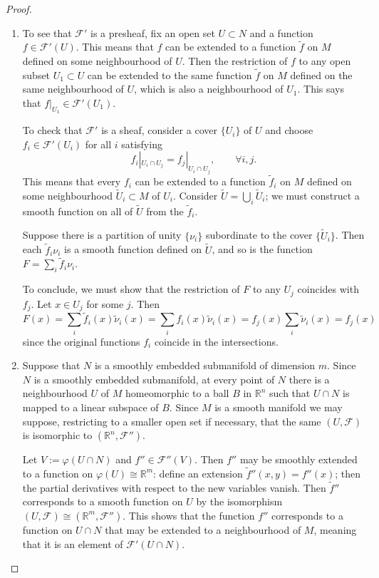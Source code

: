 \begin{proof}
\begin{enumerate}
\item To see that $\mathcal{F}'$ is a
presheaf, fix an open set $U \subset N$ and
a function $f \in \mathcal{F}'(U)$. This
means that $f$ can be extended to a
function $\tilde{f}$ on $M$ defined on some
neighbourhood of $U$. Then the restriction
of $f$ to any open subset $U_1 \subset U$
can be extended to the same function
$\tilde{f}$ on $M$ defined on the same
neighbourhood of $U$, which is also a
neighbourhood of $U_1$. This says that
$f|_{U_1}\in \mathcal{F}'(U_1)$.

To check that $\mathcal{F}'$ is a sheaf,
consider a cover $\{U_i\}$ of $U$ and choose
$f_i \in \mathcal{F}'(U_i)$ for all $i$
satisfying
$$
f_i|_{U_i \cap U_j}=f_j|_{U_i \cap U_j},
\qquad \forall i,j.
$$
This means that every $f_i$ can be extended
to a function $\tilde{f}_i$ on $M$ defined
on some neighbourhood $\tilde{U}_i \subset
M$ of $U_i$. Consider
$\tilde{U}=\bigcup_i \tilde{U}_i$; we must
construct a smooth function on all of
$\tilde{U}$ from the $\tilde{f}_i$.

Suppose there is a partition of unity
$\{\nu_i\}$ subordinate to the cover
$\{\tilde{U}_i\}$. Then each
$\tilde{f}_i \nu_i$ is a smooth function
defined on $\tilde{U}$, and so is the
function $F=\sum_i \tilde{f}_i \nu_i$.

To conclude, we must show that the
restriction of $F$ to any $U_j$ coincides
with $f_j$. Let $x \in U_j$ for some $j$.
Then
$$
F(x)=\sum_i \tilde{f}_i(x)\tilde{\nu}_i(x)
=\sum_i f_i(x)\tilde{\nu}_i(x)
=f_j(x)\sum_i \tilde{\nu}_i(x)=f_j(x)
$$
since the original functions $f_i$ coincide
in the intersections.

\item Suppose that $N$ is a smoothly
embedded submanifold of dimension $m$.
Since $N$ is a smoothly embedded
submanifold, at every point of $N$ there is
a neighbourhood $U$ of $M$ homeomorphic to
a ball $B$ in $\mathbb{R}^n$ such that
$U \cap N$ is mapped to a linear subspace of
$B$. Since $M$ is a smooth manifold we may
suppose, restricting to a smaller open set
if necessary, that the same $(U,\mathcal{F})$
is isomorphic to $(\mathbb{R}^n,\mathcal{F}'')$.

Let $V:=\varphi(U \cap N)$ and
$f'' \in \mathcal{F}''(V)$. Then $f''$ may
be smoothly extended to a function on
$\varphi(U)\cong \mathbb{R}^m$: define an
extension $\tilde{f}''(x,y)=f''(x)$; then
the partial derivatives with respect to the
new variables vanish. Then $\tilde{f}''$
corresponds to a smooth function on $U$ by
the isomorphism $(U,\mathcal{F})\cong
(\mathbb{R}^m,\mathcal{F}'')$. This shows
that the function $f''$ corresponds to a
function on $U \cap N$ that may be extended
to a neighbourhood of $M$, meaning that it
is an element of $\mathcal{F}'(U \cap N)$.


\end{enumerate}
\end{proof}
